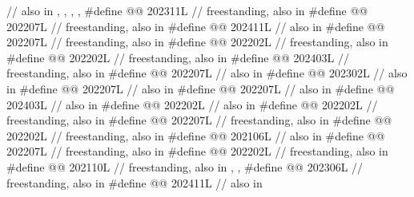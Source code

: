 \begin{codeblock}
  // also in , , , , 
#define @@                   202311L // freestanding, also in 
#define @@                  202207L // freestanding, also in 
#define @@               202411L // also in 
#define @@          202207L // freestanding, also in 
#define @@                      202202L // freestanding, also in 
#define @@                   202202L // freestanding, also in 
#define @@                     202403L // freestanding, also in 
#define @@                   202207L // also in 
#define @@                  202302L // also in 
#define @@                  202207L // also in 
#define @@                       202207L // also in 
#define @@            202403L // also in 
#define @@                       202202L // also in 
#define @@                  202202L // freestanding, also in 
#define @@                     202207L // freestanding, also in 
#define @@                      202202L // freestanding, also in 
#define @@           202106L // also in 
#define @@                     202207L // freestanding, also in 
#define @@               202202L // freestanding, also in 
#define @@                        202110L
  // freestanding, also in , , 
#define @@                             202306L // freestanding, also in 
#define @@             202411L // also in 

\end{codeblock}
